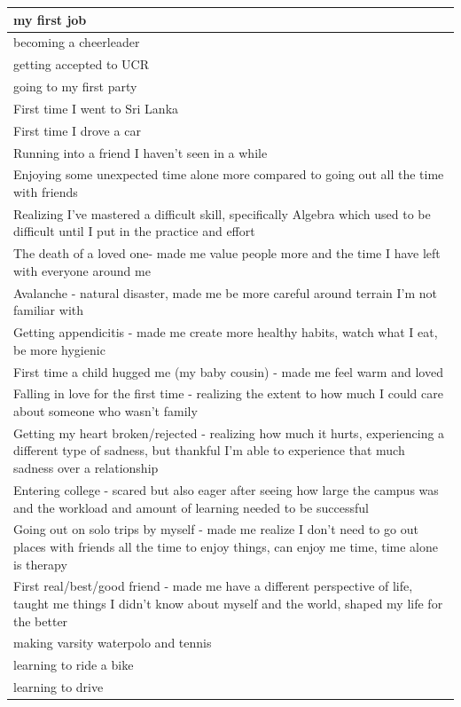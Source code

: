 \documentclass[
  .7em,
  letterpaper,
  DIV=11,
  numbers=noendperiod]{scrartcl}
\begin{document}
\begin{table}
\begin{tabular}{l}
\hline
my first job\\
\hline
becoming a cheerleader\\
\hline
getting accepted to UCR\\
\hline
going to my first party\\
\hline
First time I went to Sri Lanka\\
\hline
First time I drove a car\\
\hline
Running into a friend I haven't seen in a while\\
\hline
Enjoying some unexpected time alone more compared to going out all the time with friends\\
\hline
Realizing I've mastered a difficult skill, specifically Algebra which used to be difficult until I put in the practice and effort\\
\hline
The death of a loved one- made me value people more and the time I have left with everyone around me\\
\hline
Avalanche - natural disaster, made me be more careful around terrain I'm not familiar with\\
\hline
Getting appendicitis - made me create more healthy habits, watch what I eat, be more hygienic\\
\hline
First time a child hugged me (my baby cousin) - made me feel warm and loved\\
\hline
Falling in love for the first time - realizing the extent to how much I could care about someone who wasn't family\\
\hline
Getting my heart broken/rejected - realizing how much it hurts, experiencing a different type of sadness, but thankful I'm able to experience that much sadness over a relationship\\
\hline
Entering college - scared but also eager after seeing how large the campus was and the workload and amount of learning needed to be successful\\
\hline
Going out on solo trips by myself - made me realize I don't need to go out places with friends all the time to enjoy things, can enjoy me time, time alone is therapy\\
\hline
First real/best/good friend - made me have a different perspective of life, taught me things I didn't know about myself and the world, shaped my life for the better\\
\hline
making varsity waterpolo and tennis\\
\hline
learning to ride a bike\\
\hline
learning to drive\\

\end{tabular}
\end{table}
\end{document}
